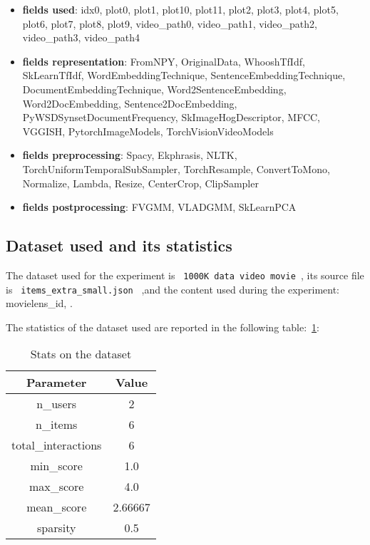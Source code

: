 \documentclass[11pt]{article}
\begin{document}
\begin{itemize}
    \item \textbf{fields used}:  idx0, plot0, plot1, plot10, plot11, plot2, plot3, plot4, plot5, plot6, plot7, plot8, plot9, video\_path0, video\_path1, video\_path2, video\_path3, video\_path4

    \item \textbf{fields representation}:  FromNPY, OriginalData, WhooshTfIdf, SkLearnTfIdf, WordEmbeddingTechnique, SentenceEmbeddingTechnique, DocumentEmbeddingTechnique, Word2SentenceEmbedding, Word2DocEmbedding, Sentence2DocEmbedding, PyWSDSynsetDocumentFrequency, SkImageHogDescriptor, MFCC, VGGISH, PytorchImageModels, TorchVisionVideoModels

    \item \textbf{fields preprocessing}:  Spacy, Ekphrasis, NLTK, TorchUniformTemporalSubSampler, TorchResample, ConvertToMono, Normalize, Lambda, Resize, CenterCrop, ClipSampler

    \item \textbf{fields postprocessing}:  FVGMM, VLADGMM, SkLearnPCA
\end{itemize}





\hfill\break
\subsection{Dataset used and its statistics}
The dataset used for the experiment is  \lstinline[style=verbatim-text]| 1000K data video movie |,
its source file is \lstinline[style=verbatim-text]| items_extra_small.json | ,and the content used during the experiment:
     movielens\_id,
.


The statistics of the dataset used are reported in the following table:~\ref{tab:dataset_table}:
\begin{table}[ht]
    \centering
  \begin{tabular}{|c|c|}
    \hline
    \textbf{Parameter}& \textbf{Value} \\ \hline
    n\_users  & 2\\ \hline
    n\_items  & 6\\ \hline
    total\_interactions  & 6\\ \hline
    min\_score  & 1.0\\ \hline
    max\_score  & 4.0\\ \hline
    mean\_score  & 2.66667\\ \hline
    sparsity  & 0.5\\ \hline
  \end{tabular}
   \caption{Stats on the dataset}\label{tab:dataset_table}
\end{table}
\end{document}
